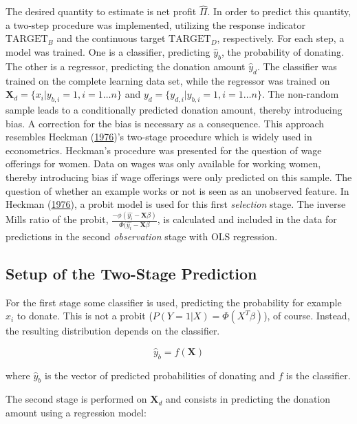 \documentclass[
  11pt,
  a4paper,
  DIV=12,captions=tableheading,oneside,titlepage]{scrbook}
\begin{document}
The desired quantity to estimate is net profit \(\hat{\Pi}\). In order to predict this quantity, a two-step procedure was implemented, utilizing the response indicator \(\text{TARGET}_B\) and the continuous target \emph{\(\text{TARGET}_D\)}, respectively. For each step, a model was trained. One is a classifier, predicting \(\hat{y}_b\), the probability of donating. The other is a regressor, predicting the donation amount \(\hat{y}_d\). The classifier was trained on the complete learning data set, while the regressor was trained on \(\mathbf{X}_d = \{x_i|y_{b,i} = 1, i=1 \ldots n\}\) and \(y_d = \{y_{d,i}|y_{b,i} = 1, i=1 \ldots n\}\). The non-random sample leads to a conditionally predicted donation amount, thereby introducing bias. A correction for the bias is necessary as a consequence. This approach resembles Heckman (\protect\hyperlink{ref-heckman1976common}{1976})'s two-stage procedure which is widely used in econometrics. Heckman's procedure was presented for the question of wage offerings for women. Data on wages was only available for working women, thereby introducing bias if wage offerings were only predicted on this sample. The question of whether an example works or not is seen as an unobserved feature. In Heckman (\protect\hyperlink{ref-heckman1976common}{1976}), a probit model is used for this first \emph{selection} stage. The inverse Mills ratio of the probit, \(\frac{-\phi(\hat{y_i}-\mathbf{X}\beta)}{\Phi(\hat{y_i}-\mathbf{X}\beta}\), is calculated and included in the data for predictions in the second \emph{observation} stage with OLS regression.

\hypertarget{setup-of-the-two-stage-prediction}{%
\subsection{Setup of the Two-Stage Prediction}\label{setup-of-the-two-stage-prediction}}

For the first stage some classifier is used, predicting the probability for example \(x_i\) to donate. This is not a probit (\(P(Y=1|X) = \Phi(X^T\beta)\)), of course. Instead, the resulting distribution depends on the classifier.

\begin{equation}
\hat{y}_b = f(\mathbf{X})
\label{eq:y-b}
\end{equation}

where \(\hat{y}_b\) is the vector of predicted probabilities of donating and \(f\) is the classifier.

The second stage is performed on \(\mathbf{X}_d\) and consists in predicting the donation amount using a regression model:
\end{document}
